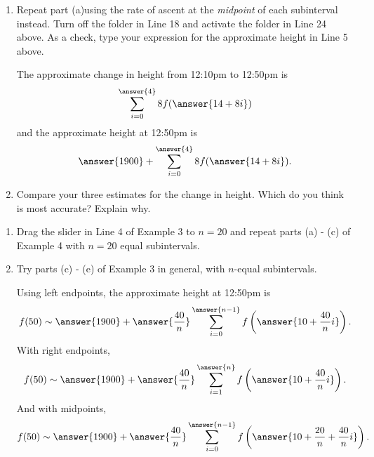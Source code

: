 \documentclass{ximera}
\begin{document}
\begin{example}
\begin{enumerate}
\item Repeat part (a)using the rate of ascent at the \emph{midpoint} of each subinterval instead. Turn off the folder in Line 18 and activate the folder in Line 24 above. As a check, type your expression for the approximate height in Line 5 above.

The approximate change in height from 12:10pm to 12:50pm is
\[
  \sum_{i=0}^{\answer{4}}8 f(\answer{14+ 8i})  
\]
and the approximate height at 12:50pm is
\[
     \answer{1900} + \sum_{i=0}^{\answer{4}}8 f(\answer{14+ 8i})  .
\]

\item Compare your three estimates for the change in height. Which do you think is most accurate? Explain why.

\end{enumerate}
\end{example} 

\begin{example}  \label{Ex:IjdRJrehreDF}
\begin{enumerate}
\item  Drag the slider in Line 4 of Example 3 to $n=20$ and repeat parts (a) - (c) of Example 4 with $n=20$ equal subintervals. 

\item Try parts (c) - (e) of Example 3 in general, with $n$-equal subintervals.

Using left endpoints, the approximate height at 12:50pm is
\[
        f(50) \sim   \answer{1900} +  \answer{\frac{40}{n}} \sum_{i=0}^{\answer{n-1}} f\left(\answer{10+ \frac{40}{n}i}\right)  .
\]
With right endpoints,
\[
        f(50) \sim   \answer{1900} +  \answer{\frac{40}{n}} \sum_{i=1}^{\answer{n}} f\left(\answer{10+ \frac{40}{n}i}\right)  .
\]
And with midpoints,
\[
        f(50) \sim   \answer{1900} +  \answer{\frac{40}{n}} \sum_{i=0}^{\answer{n-1}} f\left(\answer{10+\frac{20}{n} + \frac{40}{n}i}\right)  .
\]

\end{enumerate}
\end{example}
\end{document}
